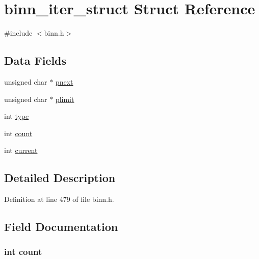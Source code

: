 \hypertarget{structbinn__iter__struct}{}\section{binn\+\_\+iter\+\_\+struct Struct Reference}
\label{structbinn__iter__struct}


{\ttfamily \#include $<$binn.\+h$>$}

\subsection*{Data Fields}
\begin{DoxyCompactItemize}
\item 
unsigned char $\ast$ \hyperlink{structbinn__iter__struct_ace82a9e1b92658f5524dbeb5ce77c294}{pnext}
\item 
unsigned char $\ast$ \hyperlink{structbinn__iter__struct_a156a80ab5f2841c2abc815b1b64f6e41}{plimit}
\item 
int \hyperlink{structbinn__iter__struct_ac765329451135abec74c45e1897abf26}{type}
\item 
int \hyperlink{structbinn__iter__struct_ad43c3812e6d13e0518d9f8b8f463ffcf}{count}
\item 
int \hyperlink{structbinn__iter__struct_ab04e2d55ea4a544f3575812582af7b51}{current}
\end{DoxyCompactItemize}


\subsection{Detailed Description}


Definition at line 479 of file binn.\+h.



\subsection{Field Documentation}
\subsubsection[{\texorpdfstring{count}{count}}]{\setlength{\rightskip}{0pt plus 5cm}int count}\hypertarget{structbinn__iter__struct_ad43c3812e6d13e0518d9f8b8f463ffcf}{}\label{structbinn__iter__struct_ad43c3812e6d13e0518d9f8b8f463ffcf}


